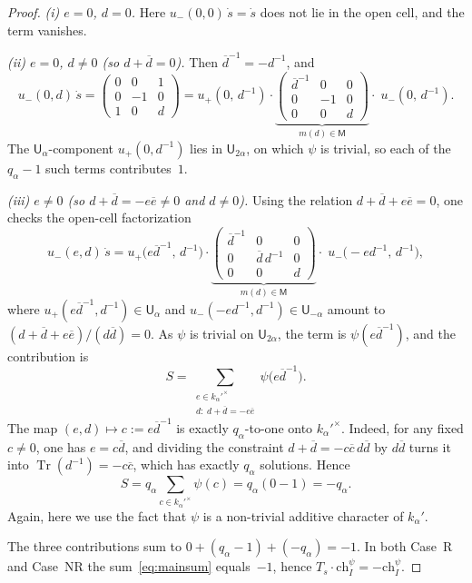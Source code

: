 \documentclass[11pt]{amsart}
\theoremstyle{definition}
\theoremstyle{remark}
\DeclareMathOperator{\Tr}{Tr}
\newcommand{\barr}[1]{\overline{#1}}
\begin{document}
\begin{proof}
\emph{(i) $e=0$, $d=0$.} Here $u_-(0,0)\,\dot{s} = \dot{s}$ does not lie in the open cell, and the term vanishes.

\emph{(ii) $e=0$, $d\neq 0$ (so $d+\barr d = 0$).} Then $\barr d^{-1} = -d^{-1}$, and
\[
u_-(0,d)\,\dot{s} = \begin{pmatrix}0&0&1\\0&-1&0\\1&0&d\end{pmatrix}
= u_+(0,\,d^{-1})\cdot
\underbrace{\begin{pmatrix}\barr d^{-1}&0&0\\0&-1&0\\0&0&d\end{pmatrix}}_{m(d)\in\mathsf{M}}
\cdot\;u_-(0,\,d^{-1}).
\]
The $\mathsf{U}_\alpha$-component $u_+(0,d^{-1})$ lies in $\mathsf{U}_{2\alpha}$, on which $\psi$ is trivial, so each of the $q_\alpha - 1$ such terms contributes~$1$.

\emph{(iii) $e\neq 0$ (so $d+\barr d = -e\barr e\neq 0$ and $d\neq 0$).} Using the relation $d+\barr d+e\barr e = 0$, one checks the open-cell factorization
\[
u_-(e,d)\,\dot{s}
= u_+\bigl(e\barr d^{-1},\, d^{-1}\bigr)\cdot
\underbrace{\begin{pmatrix}\barr d^{-1}&0&0\\0&\barr d\,d^{-1}&0\\0&0&d\end{pmatrix}}_{m(d)\in\mathsf{M}}
\cdot\;u_-\bigl(-e d^{-1},\, d^{-1}\bigr),
\]
where $u_+(e\barr d^{-1}, d^{-1})\in\mathsf{U}_\alpha$ and $u_-(-ed^{-1}, d^{-1})\in\mathsf{U}_{-\alpha}$ amount to $(d+\barr d+e\barr e)/(d\barr d) = 0$. As $\psi$ is trivial on $\mathsf{U}_{2\alpha}$, the term is $\psi(e\barr{d}^{-1})$, and the contribution is
\[
S = \sum_{\substack{e\in k_\alpha'^\times\\ d:\; d+\barr{d}=-e\barr{e}}}
\psi\bigl(e\barr{d}^{-1}\bigr).
\]
The map $(e,d)\mapsto c := e\barr{d}^{-1}$ is exactly $q_\alpha$-to-one onto $k_\alpha'^\times$. Indeed, for any fixed $c \neq 0$, one has $e = c\barr{d}$, and dividing the constraint $d+\barr{d} = -c\barr{c}\,d\barr{d}$ by $d\barr d$ turns it into $\Tr(d^{-1}) = -c\barr{c}$, which has exactly $q_\alpha$ solutions. Hence
\[
S = q_\alpha \sum_{c\in k_\alpha'^\times} \psi(c) = q_\alpha(0-1) = -q_\alpha.
\]
Again, here we use the fact that $\psi$ is a non-trivial additive character of $k_\alpha'$.

\smallskip
The three contributions sum to $0 + (q_\alpha - 1) + (-q_\alpha) = -1$. In both Case~R and Case~NR the sum~\eqref{eq:mainsum} equals~$-1$, hence $T_s\cdot\mathrm{ch}_I^\psi = -\mathrm{ch}_I^\psi$.
\end{proof}
\end{document}
